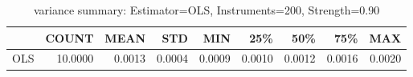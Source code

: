 \begin{table}[ht]
\centering
\caption{variance summary: Estimator=OLS, Instruments=200, Strength=0.90}
\begin{tabular}{lrrrrrrrr}
\toprule
 & COUNT & MEAN & STD & MIN & 25\% & 50\% & 75\% & MAX \\
\midrule
OLS & 10.0000 & 0.0013 & 0.0004 & 0.0009 & 0.0010 & 0.0012 & 0.0016 & 0.0020 \\
\bottomrule
\end{tabular}
\end{table}
